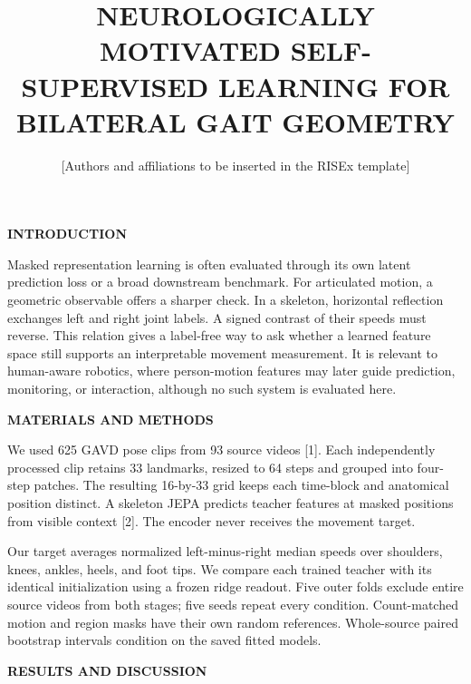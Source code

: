 \documentclass[11pt,letterpaper]{article}
\title{\vspace{-1.2em}\textbf{\MakeUppercase{Neurologically Motivated
Self-Supervised Learning for Bilateral Gait Geometry}}\vspace{-0.5em}}
\author{\normalsize [Authors and affiliations to be inserted in the RISEx template]}
\date{}
\renewcommand{\subsection}[1]{\vspace{2pt}\noindent\textbf{#1}\par\vspace{1pt}}
\begin{document}
\twocolumn[
  \begin{@twocolumnfalse}
  \maketitle
  \vspace{-1.1em}
  \end{@twocolumnfalse}
]
\subsection{INTRODUCTION}\label{introduction}

Masked representation learning is often evaluated through its own latent
prediction loss or a broad downstream benchmark. For articulated motion,
a geometric observable offers a sharper check. In a skeleton, horizontal
reflection exchanges left and right joint labels. A signed contrast of
their speeds must reverse. This relation gives a label-free way to ask
whether a learned feature space still supports an interpretable movement
measurement. It is relevant to human-aware robotics, where person-motion
features may later guide prediction, monitoring, or interaction,
although no such system is evaluated here.

\subsection{MATERIALS AND METHODS}\label{materials-and-methods}

We used 625 GAVD pose clips from 93 source videos {[}1{]}. Each
independently processed clip retains 33 landmarks, resized to 64 steps
and grouped into four-step patches. The resulting 16-by-33 grid keeps
each time-block and anatomical position distinct. A skeleton JEPA
predicts teacher features at masked positions from visible context
{[}2{]}. The encoder never receives the movement target.

Our target averages normalized left-minus-right median speeds over
shoulders, knees, ankles, heels, and foot tips. We compare each trained
teacher with its identical initialization using a frozen ridge readout.
Five outer folds exclude entire source videos from both stages; five
seeds repeat every condition. Count-matched motion and region masks have
their own random references. Whole-source paired bootstrap intervals
condition on the saved fitted models.

\subsection{RESULTS AND DISCUSSION}\label{results-and-discussion}
\end{document}
